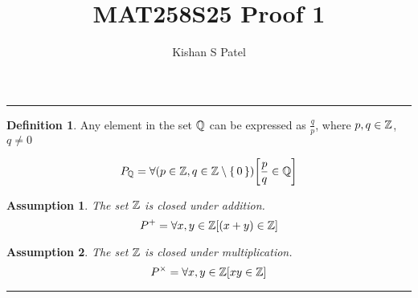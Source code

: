 \documentclass{exam}
\theoremstyle{plain}
\newtheorem{assumption}{Assumption}
\theoremstyle{definition}
\newtheorem{definition}{Definition}
\begin{document}
\title{MAT258S25 Proof 1}
\author{Kishan S Patel}
\maketitle

\noindent\rule{\textwidth}{1pt}

\begin{definition}
	Any element in the set ${\mathbb Q}$ can be expressed as $\frac{q}{p}$,
	where $p,q \in {\mathbb Z}$, $q \neq 0$

	$$P_{{\mathbb Q}} = \forall { \left(p \in {\mathbb Z}, q \in {{\mathbb Z}\setminus \set{0} }\right) } { \left[ { \frac{p}{q} \in {\mathbb Q}} \right] }$$
\end{definition}

\begin{assumption}
	The set ${\mathbb Z}$ is closed under addition.
	$$P^{+}=\forall x, y \in {\mathbb Z} { \left[ { (x+y) \in {\mathbb Z}} \right] }$$
\end{assumption}

\begin{assumption}
	The set ${\mathbb Z}$ is closed under multiplication.
	$$P^{\times} = \forall x, y \in {\mathbb Z} { \left[ { xy \in {\mathbb Z}} \right] }$$
\end{assumption}

\noindent\rule{\textwidth}{1pt}

\begin{questions}
	
	
\end{questions}
\end{document}
